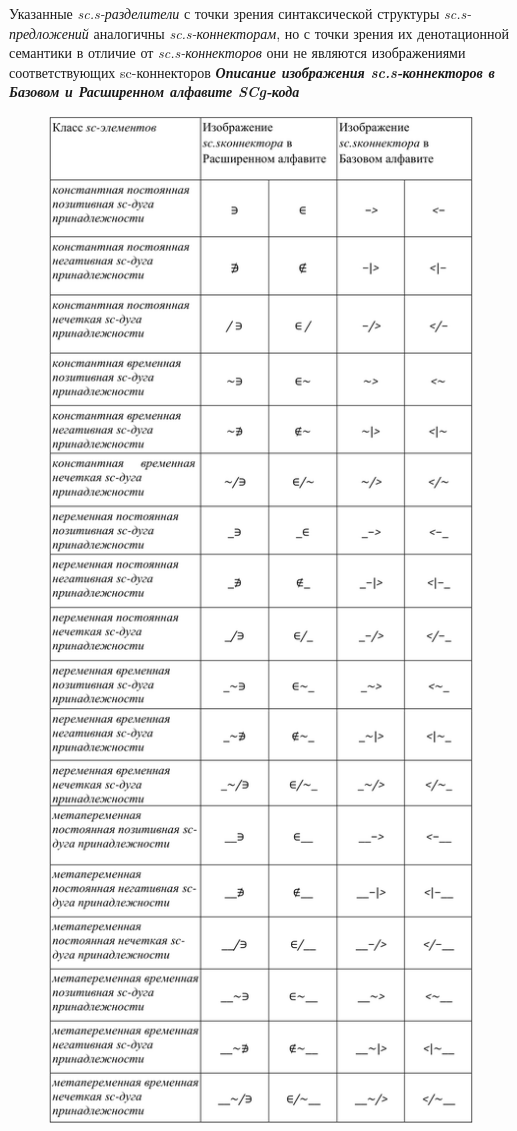 Указанные \textit{sc.s-разделители} с точки зрения синтаксической структуры \textit{sc.s-предложений} аналогичны \textit{sc.s-коннекторам}, но с точки зрения их денотационной семантики в отличие от \textit{sc.s-коннекторов} они не являются изображениями соответствующих sc-коннекторов
\newpage
\textbf{\textit{Описание изображения sc.s-коннекторов в Базовом и Расширенном алфавите SCg-кода\scnsupergroupsign}}

\begin{figure}[h]
	\centering
	\includegraphics[scale=0.3]{images/intro/scs_membership_connectors_0.png}
\end{figure}

